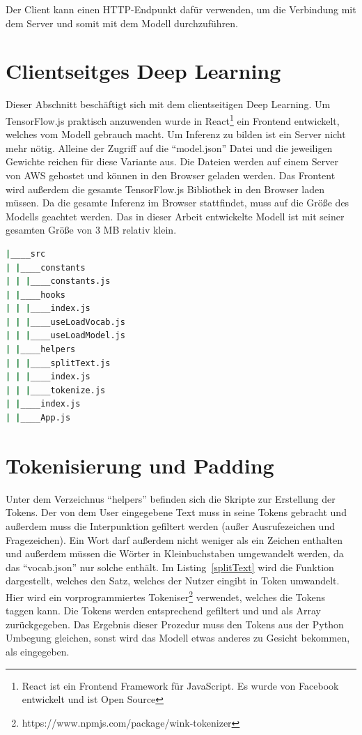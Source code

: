 Der Client kann einen HTTP-Endpunkt dafür verwenden, um die Verbindung mit dem Server und somit mit dem Modell durchzuführen.



\section{Clientseitges Deep Learning}
Dieser Abschnitt beschäftigt sich mit dem clientseitigen Deep Learning. Um TensorFlow.js praktisch anzuwenden wurde in React\footnote{React ist ein Frontend Framework für JavaScript. Es wurde von Facebook entwickelt und ist Open Source} ein Frontend entwickelt, welches vom Modell gebrauch macht.  Um Inferenz zu bilden ist ein Server nicht mehr nötig. Alleine der Zugriff auf die \enquote{model.json} Datei und die jeweiligen Gewichte reichen für diese Variante aus. Die Dateien werden auf einem Server von AWS gehostet und können in den Browser geladen werden. Das Frontent wird außerdem die gesamte TensorFlow.js Bibliothek in den Browser laden müssen. Da die gesamte Inferenz im Browser stattfindet, muss auf die Größe des Modells geachtet werden. Das in dieser Arbeit entwickelte Modell ist mit seiner gesamten Größe von 3 MB relativ klein. 

\begin{lstlisting}[language=bash,caption=Wichtigste Elemente der Benuteroberfläsche, label={OrdnerStr}]
|____src
| |____constants
| | |____constants.js
| |____hooks
| | |____index.js
| | |____useLoadVocab.js
| | |____useLoadModel.js
| |____helpers
| | |____splitText.js
| | |____index.js
| | |____tokenize.js
| |____index.js
| |____App.js
\end{lstlisting}

\section{Tokenisierung und Padding}
Unter dem Verzeichnus \enquote{helpers} befinden sich die Skripte zur Erstellung der Tokens. Der von dem User eingegebene Text muss in seine Tokens gebracht und außerdem muss die Interpunktion gefiltert werden (außer Ausrufezeichen und Fragezeichen). Ein Wort darf außerdem nicht weniger als ein Zeichen enthalten und außerdem müssen die Wörter in Kleinbuchstaben umgewandelt werden, da das \enquote{vocab.json} nur solche enthält. Im Listing~\ref{splitText} wird die Funktion dargestellt, welches den Satz, welches der Nutzer eingibt in Token umwandelt. Hier wird ein vorprogrammiertes Tokeniser\footnote{https://www.npmjs.com/package/wink-tokenizer} verwendet, welches die Tokens taggen kann. Die Tokens werden entsprechend gefiltert und und als Array zurückgegeben. Das Ergebnis dieser Prozedur muss den Tokens aus der Python Umbegung gleichen, sonst wird das Modell etwas anderes zu Gesicht bekommen, als eingegeben.

